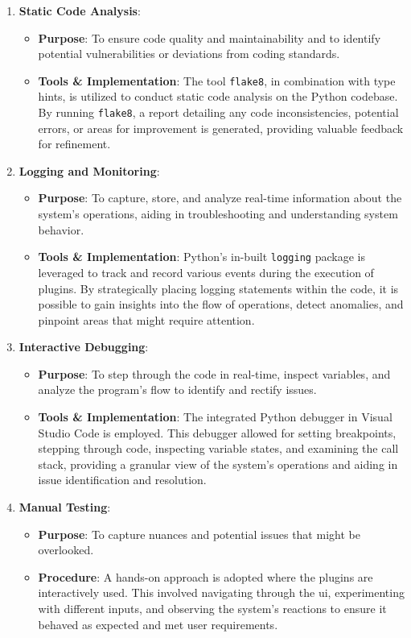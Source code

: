 \documentclass[
  a4paper,  %
  twoside,  %
  bibliography=totoc,
  headsepline,
  cleardoublepage=empty,
  parskip=half,
  draft=false
]{scrbook}
\begin{document}
\begin{enumerate}
    \item \textbf{Static Code Analysis}:
    \begin{itemize}
        \item \textbf{Purpose}: To ensure code quality and maintainability and to identify potential vulnerabilities or deviations from coding standards.
        \item \textbf{Tools \& Implementation}: The tool \texttt{flake8}, in combination with type hints, is utilized to conduct static code analysis on the Python codebase.
        By running \texttt{flake8}, a report detailing any code inconsistencies, potential errors, or areas for improvement is generated, providing valuable feedback for refinement.
    \end{itemize}

    \item \textbf{Logging and Monitoring}:
    \begin{itemize}
        \item \textbf{Purpose}: To capture, store, and analyze real-time information about the system's operations, aiding in troubleshooting and understanding system behavior.
        \item \textbf{Tools \& Implementation}: Python's in-built \texttt{logging} package is leveraged to track and record various events during the execution of plugins.
        By strategically placing logging statements within the code, it is possible to gain insights into the flow of operations, detect anomalies, and pinpoint areas that might require attention.
    \end{itemize}

    \item \textbf{Interactive Debugging}:
    \begin{itemize}
        \item \textbf{Purpose}: To step through the code in real-time, inspect variables, and analyze the program's flow to identify and rectify issues.
        \item \textbf{Tools \& Implementation}: The integrated Python debugger in Visual Studio Code is employed.
        This debugger allowed for setting breakpoints, stepping through code, inspecting variable states, and examining the call stack, providing a granular view of the system's operations and aiding in issue identification and resolution.
    \end{itemize}

    \item \textbf{Manual Testing}:
    \begin{itemize}
        \item \textbf{Purpose}: To capture nuances and potential issues that might be overlooked.
        \item \textbf{Procedure}: A hands-on approach is adopted where the plugins are interactively used.
        This involved navigating through the \gls{ui}, experimenting with different inputs, and observing the system's reactions to ensure it behaved as expected and met user requirements.
    \end{itemize}
\end{enumerate}
\end{document}
